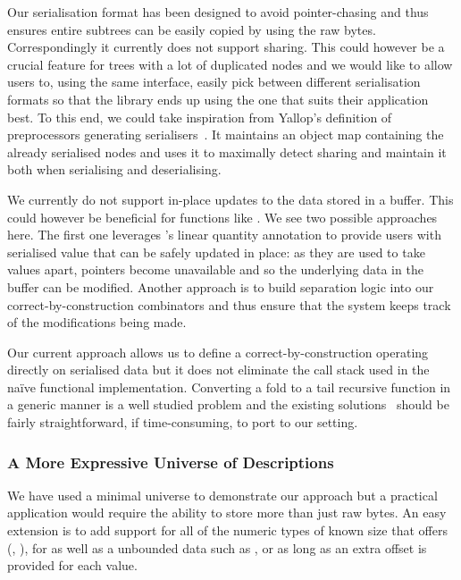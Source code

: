 Our serialisation format has been designed to avoid pointer-chasing and
thus ensures entire subtrees can be easily copied by using the raw bytes.
Correspondingly it currently does not support sharing.
%
This could however be a crucial feature for trees with a lot of duplicated
nodes and we would like to allow users to, using the same interface,
easily pick between different serialisation formats so that the library
ends up using the one that suits their application best.
%
To this end, we could take inspiration from Yallop's
definition of preprocessors generating serialisers~\cite{DBLP:conf/ml/Yallop07}.
It maintains an object map containing the already serialised nodes and uses it
to maximally detect sharing and maintain it both when serialising and deserialising.

We currently do not support in-place updates to the data stored in a buffer.
This could however be beneficial for functions like .
%
We see two possible approaches here. The first one leverages \idris{}'s
linear quantity annotation to provide users with serialised value that
can be safely updated in place: as they are used to take values apart,
pointers become unavailable and so the underlying data in the buffer can
be modified.
%
Another approach is to build separation logic into our correct-by-construction
combinators and thus ensure that the system keeps track of the modifications
being made.


Our current approach allows us to define a correct-by-construction
 operating directly on serialised data but it
does not eliminate the call stack used in the naïve functional
implementation.
%
Converting a fold to a tail recursive function in a generic manner
is a well studied problem and the existing
solutions~\cite{DBLP:conf/popl/McBride08,DBLP:conf/icfp/CortinasS18}
should be fairly straightforward, if time-consuming, to port to our setting.

\subsubsection{A More Expressive Universe of Descriptions}

We have used a minimal universe to demonstrate our approach but a practical
application would require the ability to store more than just raw bytes.
An easy extension is to add support for all of the numeric types of
known size that \idris{} offers
(, ),
for 
as well as a unbounded data such as , or 
as long as an extra offset is provided for each value.

